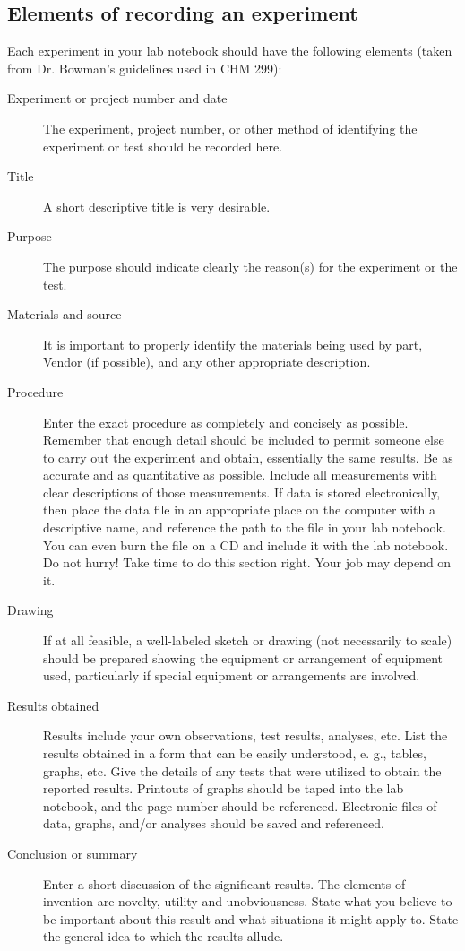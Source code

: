 \subsection*{Elements of recording an experiment}

Each experiment in your lab notebook should have the following elements (taken from Dr. Bowman's guidelines used in CHM 299):

\begin{description}
	\item[Experiment or project number and date] The experiment, project number, or other method of identifying the experiment or test should be recorded here.
	\item[Title] A short descriptive title is very desirable.
	\item[Purpose] The purpose should indicate clearly the reason(s) for the experiment or the test.
	\item[Materials and source] It is important to properly identify the materials being used by part, Vendor (if possible), and any other appropriate description.
	\item[Procedure] Enter the exact procedure as completely and concisely as possible. Remember that enough detail should be included to permit someone else to carry out the experiment and obtain, essentially the same results.  Be as accurate and as quantitative as possible. Include all measurements with clear descriptions of those measurements. If data is stored electronically, then place the data file in an appropriate place on the computer with a descriptive name, and reference the path to the file in your lab notebook. You can even burn the file on a CD and include it with the lab notebook.  Do not hurry!  Take time to do this section right.  Your job may depend on it.
	\item[Drawing] If at all feasible, a well-labeled sketch or drawing (not necessarily to scale) should be prepared showing the equipment or arrangement of equipment used, particularly if special equipment or arrangements are involved.
	\item[Results obtained] Results include your own observations, test results, analyses, etc.  List the results obtained in a form that can be easily understood, e. g., tables, graphs, etc.  Give the details of any tests that were utilized to obtain the reported results. Printouts of graphs should be taped into the lab notebook, and the page number should be referenced. Electronic files of data, graphs, and/or analyses should be saved and referenced.
	\item[Conclusion or summary] Enter a short discussion of the significant results. The elements of invention are novelty, utility and unobviousness. State what you believe to be important about this result and what situations it might apply to. State the general idea to which the results allude.


\end{description}
